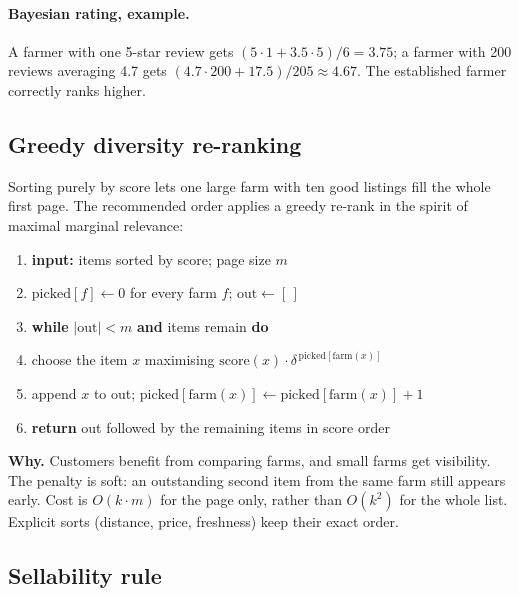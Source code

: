 \documentclass[11pt,a4paper]{article}
\newenvironment{pseudo}{\small\begin{enumerate}[label={\scriptsize\arabic*}, leftmargin=7mm, itemsep=1pt, topsep=3pt]}{\end{enumerate}}
\newcommand{\kw}[1]{\textbf{#1}}
\newcommand{\ind}{\hspace*{5mm}}
\begin{document}
\paragraph{Bayesian rating, example.} A farmer with one 5-star review gets $(5\cdot1+3.5\cdot5)/6 = 3.75$; a farmer with 200 reviews averaging 4.7 gets $(4.7\cdot200+17.5)/205 \approx 4.67$. The established farmer correctly ranks higher.

\subsection{Greedy diversity re-ranking}

Sorting purely by score lets one large farm with ten good listings fill the whole first page. The recommended order applies a greedy re-rank in the spirit of maximal marginal relevance:

\begin{algorithm}[H]
\caption{Farm-diversity re-rank (decay $\delta = 0.85$)}
\begin{pseudo}
  \item \kw{input:} items sorted by score; page size $m$
  \item $\text{picked}[f] \gets 0$ for every farm $f$; $\text{out} \gets [\,]$
  \item \kw{while} $|\text{out}| < m$ \kw{and} items remain \kw{do}
  \item \ind choose the item $x$ maximising $\text{score}(x)\cdot\delta^{\,\text{picked}[\text{farm}(x)]}$
  \item \ind append $x$ to out; $\text{picked}[\text{farm}(x)] \gets \text{picked}[\text{farm}(x)] + 1$
  \item \kw{return} out followed by the remaining items in score order
\end{pseudo}
\end{algorithm}

\noindent \textbf{Why.} Customers benefit from comparing farms, and small farms get visibility. The penalty is soft: an outstanding second item from the same farm still appears early. Cost is $O(k\cdot m)$ for the page only, rather than $O(k^2)$ for the whole list. Explicit sorts (distance, price, freshness) keep their exact order.

\subsection{Sellability rule}
\end{document}

